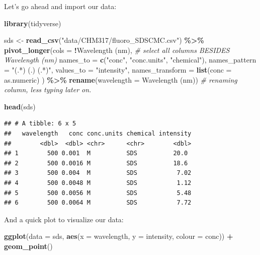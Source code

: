 \documentclass[
]{book}
\newenvironment{Shaded}{\begin{snugshade}}{\end{snugshade}}
\newcommand{\AttributeTok}[1]{\textcolor[rgb]{0.13,0.29,0.53}{#1}}
\newcommand{\CommentTok}[1]{\textcolor[rgb]{0.56,0.35,0.01}{\textit{#1}}}
\newcommand{\FunctionTok}[1]{\textcolor[rgb]{0.13,0.29,0.53}{\textbf{#1}}}
\newcommand{\NormalTok}[1]{#1}
\newcommand{\OtherTok}[1]{\textcolor[rgb]{0.56,0.35,0.01}{#1}}
\newcommand{\SpecialCharTok}[1]{\textcolor[rgb]{0.81,0.36,0.00}{\textbf{#1}}}
\newcommand{\StringTok}[1]{\textcolor[rgb]{0.31,0.60,0.02}{#1}}
\begin{document}
Let's go ahead and import our data:

\begin{Shaded}
\begin{Highlighting}[]
\FunctionTok{library}\NormalTok{(tidyverse)}

\NormalTok{sds }\OtherTok{\textless{}{-}} \FunctionTok{read\_csv}\NormalTok{(}\StringTok{"data/CHM317/fluoro\_SDSCMC.csv"}\NormalTok{) }\SpecialCharTok{\%\textgreater{}\%}
  \FunctionTok{pivot\_longer}\NormalTok{(}\AttributeTok{cols =} \SpecialCharTok{!}\StringTok{\textasciigrave{}}\AttributeTok{Wavelength (nm)}\StringTok{\textasciigrave{}}\NormalTok{, }\CommentTok{\# select all columns BESIDES \textasciigrave{}Wavelength (nm)\textasciigrave{}}
               \AttributeTok{names\_to =} \FunctionTok{c}\NormalTok{(}\StringTok{"conc"}\NormalTok{, }\StringTok{"conc.units"}\NormalTok{, }\StringTok{"chemical"}\NormalTok{),}
               \AttributeTok{names\_pattern =} \StringTok{"(.*) (.) (.*)"}\NormalTok{,}
               \AttributeTok{values\_to =} \StringTok{"intensity"}\NormalTok{,}
               \AttributeTok{names\_transform =} \FunctionTok{list}\NormalTok{(}\AttributeTok{conc =}\NormalTok{ as.numeric)}
\NormalTok{  ) }\SpecialCharTok{\%\textgreater{}\%}
  \FunctionTok{rename}\NormalTok{(}\AttributeTok{wavelength =} \StringTok{\textquotesingle{}Wavelength (nm)\textquotesingle{}}\NormalTok{) }\CommentTok{\# renaming column, less typing later on. }

\FunctionTok{head}\NormalTok{(sds)}
\end{Highlighting}
\end{Shaded}

\begin{verbatim}
## # A tibble: 6 x 5
##   wavelength   conc conc.units chemical intensity
##        <dbl>  <dbl> <chr>      <chr>        <dbl>
## 1        500 0.001  M          SDS          20.0 
## 2        500 0.0016 M          SDS          18.6 
## 3        500 0.004  M          SDS           7.02
## 4        500 0.0048 M          SDS           1.12
## 5        500 0.0056 M          SDS           5.48
## 6        500 0.0064 M          SDS           7.72
\end{verbatim}

And a quick plot to visualize our data:

\begin{Shaded}
\begin{Highlighting}[]
\FunctionTok{ggplot}\NormalTok{(}\AttributeTok{data =}\NormalTok{ sds, }
       \FunctionTok{aes}\NormalTok{(}\AttributeTok{x =}\NormalTok{ wavelength,}
           \AttributeTok{y =}\NormalTok{ intensity, }
           \AttributeTok{colour =}\NormalTok{ conc)) }\SpecialCharTok{+}
  \FunctionTok{geom\_point}\NormalTok{() }
\end{Highlighting}
\end{Shaded}
\end{document}
